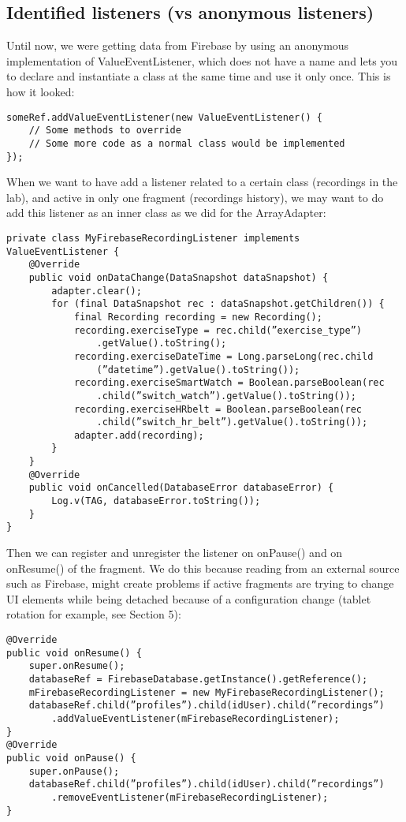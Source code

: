 \documentclass[11pt]{article}
\begin{document}
\subsection{Identified listeners (vs anonymous listeners)}
Until now, we were getting data from Firebase by using an anonymous implementation of ValueEventListener, which does not have a name and lets you to declare and instantiate a class at the same time and use it only once. This is how it looked:
\begin{lstlisting}
someRef.addValueEventListener(new ValueEventListener() {
    // Some methods to override
    // Some more code as a normal class would be implemented
});
\end{lstlisting}
When we want to have add a listener related to a certain class (recordings in the lab), and active in only one fragment (recordings history), we may want to do add this listener as an inner class as we did for the ArrayAdapter: 
\begin{lstlisting}
private class MyFirebaseRecordingListener implements ValueEventListener {
    @Override
    public void onDataChange(DataSnapshot dataSnapshot) {
        adapter.clear();
        for (final DataSnapshot rec : dataSnapshot.getChildren()) {
            final Recording recording = new Recording();
            recording.exerciseType = rec.child(”exercise_type”)
                .getValue().toString();
            recording.exerciseDateTime = Long.parseLong(rec.child
                (”datetime”).getValue().toString());
            recording.exerciseSmartWatch = Boolean.parseBoolean(rec
                .child(”switch_watch”).getValue().toString());
            recording.exerciseHRbelt = Boolean.parseBoolean(rec
                .child(”switch_hr_belt”).getValue().toString());
            adapter.add(recording);
        }
    }
    @Override
    public void onCancelled(DatabaseError databaseError) {
        Log.v(TAG, databaseError.toString());
    }
}
\end{lstlisting}
Then we can register and unregister the listener on onPause() and on onResume() of the fragment. We do this because reading from an external source such as Firebase, might create problems if active fragments are trying to change UI elements while being detached because of a configuration change (tablet rotation for example, see Section 5):
\begin{lstlisting}
@Override
public void onResume() {
    super.onResume();
    databaseRef = FirebaseDatabase.getInstance().getReference();
    mFirebaseRecordingListener = new MyFirebaseRecordingListener();
    databaseRef.child(”profiles”).child(idUser).child(”recordings”)
        .addValueEventListener(mFirebaseRecordingListener);
}
@Override
public void onPause() {
    super.onPause();
    databaseRef.child(”profiles”).child(idUser).child(”recordings”)
        .removeEventListener(mFirebaseRecordingListener);
}
\end{lstlisting}
\end{document}
